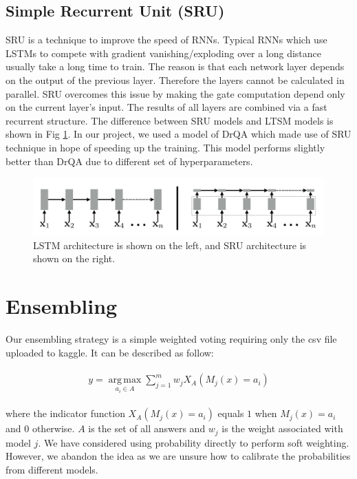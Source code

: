 \documentclass[paper=a4, fontsize=11pt]{scrartcl} %
\begin{document}
\subsection{Simple Recurrent Unit (SRU)}
SRU is a technique to improve the speed of RNNs. Typical RNNs which use LSTMs to compete with gradient vanishing/exploding over a long distance usually take a long time to train. The reason is that each network layer depends on the output of the previous layer. Therefore the layers cannot be calculated in parallel.
SRU overcomes this issue by making the gate computation depend only on the current layer’s input. The results of all layers are combined via a fast recurrent structure. The difference between SRU models and LTSM models is shown in Fig \ref{fig:sru}.
In our project, we used a model of DrQA which made use of SRU technique in hope of speeding up the training. This model performs slightly better than DrQA due to different set of hyperparameters.
\begin{figure}[htb]\centering
	\includegraphics[scale=0.5]{sru.png}
	\caption{LSTM architecture is shown on the left, and SRU architecture is shown on the right.}
	\label{fig:sru}
\end{figure}

\section{Ensembling}
Our ensembling strategy is a simple weighted voting requiring only the csv file uploaded to kaggle. It can be described as follow:

\begin{align} 
\begin{split}
y = \underset{a_i \in A }{\operatorname{arg\,max}} \sum_{j = 1}^m w_jX_A(M_j(x)=a_i)	 
\end{split}					
\end{align} 

where the indicator function $X_A(M_j(x)=a_i)$ equals $1$ when $M_j(x)=a_i$ and $0$ otherwise. $A$ is the set of all answers and $w_j$ is the weight associated with model $j$. We have considered using probability directly to perform soft weighting. However, we abandon the idea as we are unsure how to calibrate the probabilities from different models.
\end{document}
